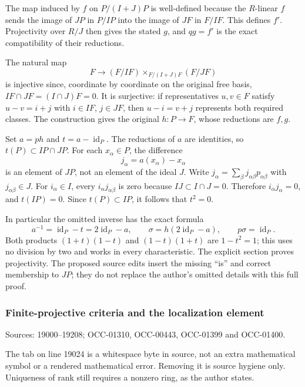 The map induced by \(f\) on \(P/(I+J)P\) is well-defined because the \(R\)-linear \(f\) sends the image of \(JP\) in \(P/IP\) into the image of \(JF\) in \(F/IF\). This defines \(f'\). Projectivity over \(R/J\) then gives the stated \(g\), and \(qg=f'\) is the exact compatibility of their reductions.

The natural map \[
F\longrightarrow(F/IF)\times_{F/(I+J)F}(F/JF)
\] is injective since, coordinate by coordinate on the original free basis, \(IF\cap JF=(I\cap J)F=0\). It is surjective: if representatives \(u,v\in F\) satisfy \(u-v=i+j\) with \(i\in IF\), \(j\in JF\), then \(u-i=v+j\) represents both required classes. The construction gives the original \(h:P\to F\), whose reductions are \(f,g\).

Set \(a=ph\) and \(t=a-\operatorname{id}_P\). The reductions of \(a\) are identities, so \(t(P)\subset IP\cap JP\). For each \(x_\alpha\in P\), the difference \[
j_\alpha=a(x_\alpha)-x_\alpha
\] is an element of \(JP\), not an element of the ideal \(J\). Write \(j_\alpha=\sum_\beta j_{\alpha\beta}p_{\alpha\beta}\) with \(j_{\alpha\beta}\in J\). For \(i_\alpha\in I\), every \(i_\alpha j_{\alpha\beta}\) is zero because \(IJ\subset I\cap J=0\). Therefore \(i_\alpha j_\alpha=0\), and \(t(IP)=0\). Since \(t(P)\subset IP\), it follows that \(t^2=0\).

In particular the omitted inverse has the exact formula \[
a^{-1}=\operatorname{id}_P-t=2\operatorname{id}_P-a,
\qquad
\sigma=h(2\operatorname{id}_P-a),\qquad p\sigma=\operatorname{id}_P.
\] Both products \((1+t)(1-t)\) and \((1-t)(1+t)\) are \(1-t^2=1\); this uses no division by two and works in every characteristic. The explicit section proves projectivity. The proposed source edits insert the missing ``is'' and correct membership to \(JP\); they do not replace the author's omitted details with this full proof.

\subsubsection{Finite-projective criteria and the localization element}\label{algebra-proof-009-finite-projective-criteria-and-the-localization-element}

Sources: 19000--19208; OCC-01310, OCC-00443, OCC-01399 and OCC-01400.

The tab on line 19024 is a whitespace byte in source, not an extra mathematical symbol or a rendered mathematical error. Removing it is source hygiene only. Uniqueness of rank still requires a nonzero ring, as the author states.

